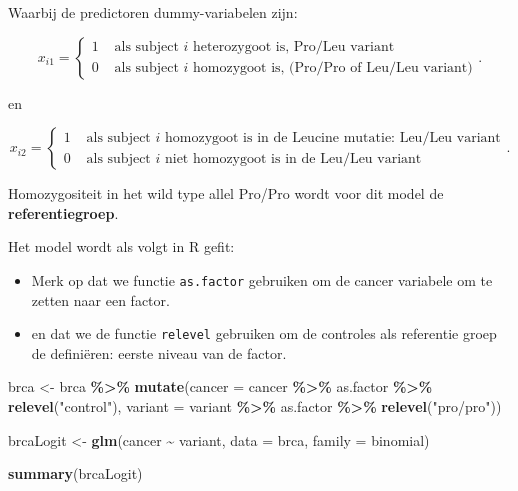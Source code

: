 \documentclass[
  12pt,dutch,coursenotes]{book}
\newenvironment{Shaded}{\begin{snugshade}}{\end{snugshade}}
\newcommand{\DataTypeTok}[1]{\textcolor[rgb]{0.13,0.29,0.53}{#1}}
\newcommand{\KeywordTok}[1]{\textcolor[rgb]{0.13,0.29,0.53}{\textbf{#1}}}
\newcommand{\NormalTok}[1]{#1}
\newcommand{\OperatorTok}[1]{\textcolor[rgb]{0.81,0.36,0.00}{\textbf{#1}}}
\newcommand{\StringTok}[1]{\textcolor[rgb]{0.31,0.60,0.02}{#1}}
\providecommand{\tightlist}{%
  \setlength{\itemsep}{0pt}\setlength{\parskip}{0pt}}
\theoremstyle{definition}
\theoremstyle{definition}
\theoremstyle{definition}
\theoremstyle{remark}
\begin{document}
Waarbij de predictoren dummy-variabelen zijn:

\[x_{i1} = \left\{ \begin{array}{ll}
1 & \text{ als subject $i$ heterozygoot is, Pro/Leu variant} \\
0 & \text{ als subject $i$ homozygoot is, (Pro/Pro of Leu/Leu variant)} \end{array}\right. .\]

en

\[x_{i2} = \left\{ \begin{array}{ll}
1 & \text{ als subject $i$ homozygoot is in de Leucine mutatie: Leu/Leu variant} \\
0 & \text{ als subject $i$ niet homozygoot is in de Leu/Leu variant} \end{array}\right. .\]

Homozygositeit in het wild type allel Pro/Pro wordt voor dit model de \textbf{referentiegroep}.

Het model wordt als volgt in R gefit:

\begin{itemize}
\tightlist
\item
  Merk op dat we functie \texttt{as.factor} gebruiken om de cancer variabele om te zetten naar een factor.
\item
  en dat we de functie \texttt{relevel} gebruiken om de controles als referentie groep de definiëren: eerste niveau van de factor.
\end{itemize}

\begin{Shaded}
\begin{Highlighting}[]
\NormalTok{brca \textless{}{-}}\StringTok{ }\NormalTok{brca }\OperatorTok{\%\textgreater{}\%}\StringTok{ }\KeywordTok{mutate}\NormalTok{(}\DataTypeTok{cancer =}\NormalTok{ cancer }\OperatorTok{\%\textgreater{}\%}\StringTok{ }\NormalTok{as.factor }\OperatorTok{\%\textgreater{}\%}\StringTok{ }
\StringTok{    }\KeywordTok{relevel}\NormalTok{(}\StringTok{"control"}\NormalTok{), }\DataTypeTok{variant =}\NormalTok{ variant }\OperatorTok{\%\textgreater{}\%}\StringTok{ }\NormalTok{as.factor }\OperatorTok{\%\textgreater{}\%}\StringTok{ }
\StringTok{    }\KeywordTok{relevel}\NormalTok{(}\StringTok{"pro/pro"}\NormalTok{))}

\NormalTok{brcaLogit \textless{}{-}}\StringTok{ }\KeywordTok{glm}\NormalTok{(cancer }\OperatorTok{\textasciitilde{}}\StringTok{ }\NormalTok{variant, }\DataTypeTok{data =}\NormalTok{ brca, }\DataTypeTok{family =}\NormalTok{ binomial)}

\KeywordTok{summary}\NormalTok{(brcaLogit)}
\end{Highlighting}
\end{Shaded}
\end{document}
